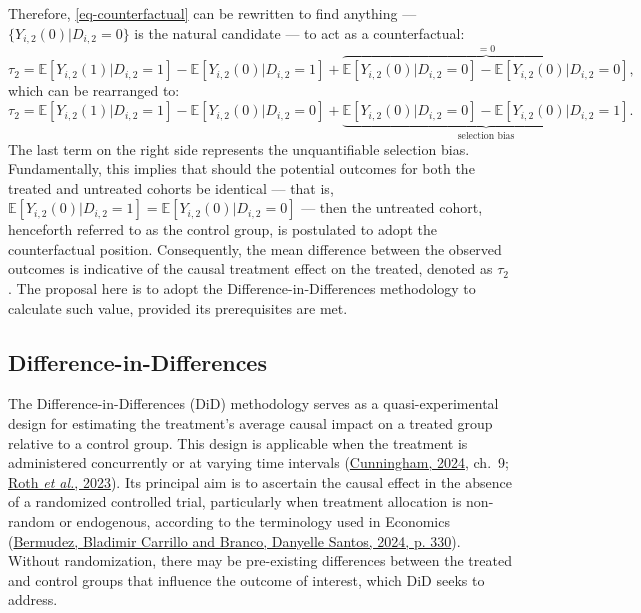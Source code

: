\documentclass[12pt, a4paper, twoside]{article}
\numberwithin{equation}{subsection} %
\begin{document}
Therefore, \eqref{eq-counterfactual} can be rewritten to find anything
--- \(\{Y_{i,2}(0) | D_{i,2} = 0\}\) is the natural candidate --- to act
as a counterfactual: \begin{equation*} 
\tau_2 = \mathbb{E}[Y_{i,2}(1)| D_{i,2} = 1] - \mathbb{E}[Y_{i,2}(0) | D_{i,2} = 1] + \overbrace{\mathbb{E}[Y_{i,2}(0) | D_{i,2} = 0] - \mathbb{E}[Y_{i,2}(0) | D_{i,2} = 0]}^{= 0},
\end{equation*} which can be rearranged to: \begin{equation} 
      \tau_2 = \mathbb{E}[Y_{i,2}(1)| D_{i,2} = 1] - \mathbb{E}[Y_{i,2}(0) | D_{i,2} = 0]  + \underbrace{\mathbb{E}[Y_{i,2}(0) | D_{i,2} = 0] - \mathbb{E}[Y_{i,2}(0) | D_{i,2} = 1]}_{\text{selection bias}}.
\end{equation} The last term on the right side represents the
unquantifiable selection bias. Fundamentally, this implies that should
the potential outcomes for both the treated and untreated cohorts be
identical --- that is,
\(\mathbb{E}[Y_{i,2}(0) | D_{i,2} = 1] = \mathbb{E}[Y_{i,2}(0) | D_{i,2} = 0]\)
--- then the untreated cohort, henceforth referred to as the control
group, is postulated to adopt the counterfactual position. Consequently,
the mean difference between the observed outcomes is indicative of the
causal treatment effect on the treated, denoted as \(\tau_2\). The
proposal here is to adopt the Difference-in-Differences methodology to
calculate such value, provided its prerequisites are met.

\hypertarget{sec-did}{%
\subsection{Difference-in-Differences}\label{sec-did}}

The Difference-in-Differences (DiD) methodology serves as a
quasi-experimental design for estimating the treatment's average causal
impact on a treated group relative to a control group. This design is
applicable when the treatment is administered concurrently or at varying
time intervals
(\protect\hyperlink{ref-cunningham_causal_2024}{Cunningham, 2024},
ch.~9; \protect\hyperlink{ref-roth_whats_2023}{Roth \emph{et al.},
2023}). Its principal aim is to ascertain the causal effect in the
absence of a randomized controlled trial, particularly when treatment
allocation is non-random or endogenous, according to the terminology
used in Economics
(\protect\hyperlink{ref-bladimir_carrillo_bermudez_o_2024}{Bermudez,
Bladimir Carrillo and Branco, Danyelle Santos, 2024, p. 330}). Without
randomization, there may be pre-existing differences between the treated
and control groups that influence the outcome of interest, which DiD
seeks to address.
\end{document}

